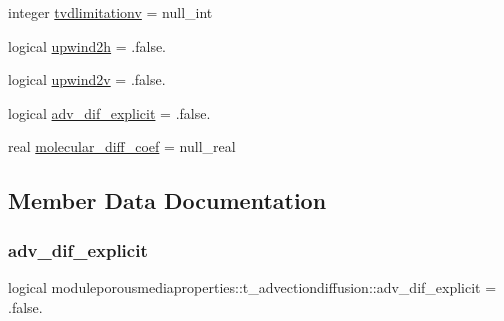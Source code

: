 \begin{DoxyCompactItemize}
\item 
integer \mbox{\hyperlink{structmoduleporousmediaproperties_1_1t__advectiondiffusion_a6aa9008c271a41f54550729552215045}{tvdlimitationv}} = null\+\_\+int
\item 
logical \mbox{\hyperlink{structmoduleporousmediaproperties_1_1t__advectiondiffusion_a413680b726f168fac81f373108299935}{upwind2h}} = .false.
\item 
logical \mbox{\hyperlink{structmoduleporousmediaproperties_1_1t__advectiondiffusion_a489ca83c1787a9d9bc914ed2169fa069}{upwind2v}} = .false.
\item 
logical \mbox{\hyperlink{structmoduleporousmediaproperties_1_1t__advectiondiffusion_a7bb944b60872ad2252d1ea8951e00a80}{adv\+\_\+dif\+\_\+explicit}} = .false.
\item 
real \mbox{\hyperlink{structmoduleporousmediaproperties_1_1t__advectiondiffusion_a54c44fd9840aa609d05330e8c423c6a9}{molecular\+\_\+diff\+\_\+coef}} = null\+\_\+real
\end{DoxyCompactItemize}


\subsection{Member Data Documentation}
\mbox{\label{structmoduleporousmediaproperties_1_1t__advectiondiffusion_a7bb944b60872ad2252d1ea8951e00a80}} 
\subsubsection{\texorpdfstring{adv\+\_\+dif\+\_\+explicit}{adv\_dif\_explicit}}
{\footnotesize\ttfamily logical moduleporousmediaproperties\+::t\+\_\+advectiondiffusion\+::adv\+\_\+dif\+\_\+explicit = .false.\hspace{0.3cm}{\ttfamily [private]}}

\mbox{\label{structmoduleporousmediaproperties_1_1t__advectiondiffusion_ad55337eb18ef6d4b3b4682d6dafefc0a}} 
